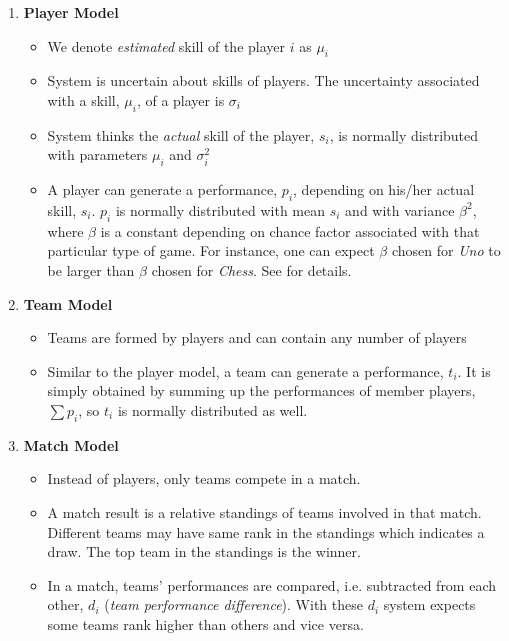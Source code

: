 \documentclass[12pt]{article}
\begin{document}
\begin{enumerate}

	\item \textbf{Player Model}
	\begin{itemize}
		\item We denote \textit{estimated} skill of the player $i$ as $\mu_i$
		\item System is uncertain about skills of players. The uncertainty associated with a skill, $\mu_i$, of a player is $\sigma_i$
		\item System thinks the \textit{actual }skill of the player, $s_i$, is normally distributed with parameters $\mu_i$ and $\sigma^2_i$		
		\item A player can generate a performance, $p_i$, depending on his/her actual skill, $s_i$. $p_i$ is normally distributed with mean $s_i$ and with variance $\beta^2$, where $\beta$ is a constant depending on chance factor associated with that particular type of game. For instance, one can expect $\beta$ chosen for \textit{Uno} to be larger than $\beta$ chosen for \textit{Chess}. See \cite{moser} for details.
	\end{itemize}

	\item \textbf{Team Model}
	\begin{itemize}
		\item Teams are formed by players and can contain any number of players
		\item Similar to the player model, a team can generate a performance, $t_i$. It is simply obtained by summing up the performances of member players, $\sum p_i$, so $t_i$ is normally distributed as well.
	\end{itemize}

	\item \textbf{Match Model}
	\begin{itemize}
		\item Instead of players, only teams compete in a match. 
		\item A match result is a relative standings of teams involved in that match. Different teams may have same rank in the standings which indicates a draw. The top team in the standings is the winner.
		\item In a match, teams' performances are compared, i.e. subtracted from each other, $d_i$ (\textit{team performance difference}). With these $d_i$ system expects some teams rank higher than others and vice versa.
	\end{itemize}	
\end{enumerate}
\end{document}
